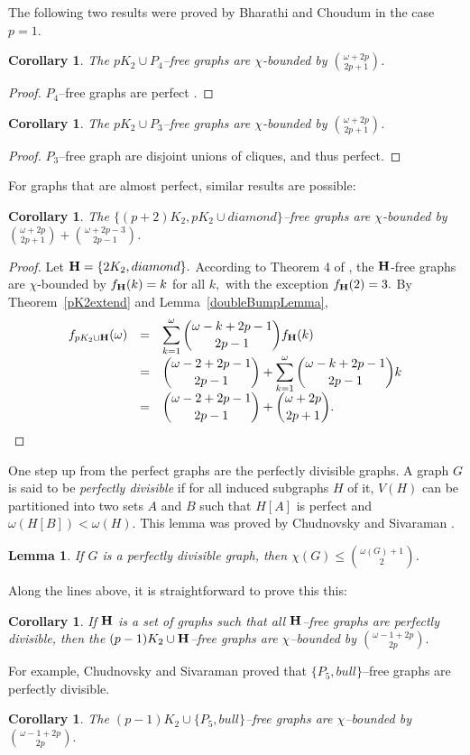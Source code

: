 \documentclass{article}
\theoremstyle{plain}
\newtheorem{lem}[thm]{Lemma}
\newtheorem{cor}[thm]{Corollary}
\theoremstyle{definition}
\begin{document}
The following two results were proved by  Bharathi and Choudum \cite{BC18} in the case $p=1.$
\begin{cor}
The ${ pK_2 \cup P_4}$--free graphs are $\chi$-bounded by $\omega + 2p \choose 2p+1$.
\end{cor}
\begin{proof}
$P_4$--free graphs are perfect \cite{S74}.
\end{proof}
\begin{cor}
The ${ pK_2 \cup P_3}$--free graphs are $\chi$-bounded by $\omega + 2p \choose 2p+1$.
\end{cor}
\begin{proof}
$P_3$--free graph are disjoint unions of cliques, and thus perfect.
\end{proof}

For graphs that are almost perfect, similar results are possible:

\begin{cor}
The $\{ (p+2)K_2, pK_2 \cup diamond\}$--free graphs are $\chi$-bounded by $ {\omega + 2p \choose 2p+1} +   {\omega + 2p-3  \choose 2p-1}  $.
\end{cor}
\begin{proof}
Let ${\bf H} = \{2K_2, diamond\}.$
According to Theorem 4 of \cite{BC18}, the $\bf H$-free graphs are $\chi$-bounded by $ f_{{\bf H  } }(k) = k$ for all $k,$ with the exception $ f_{{\bf H  } }(2) = 3.$
By Theorem~\ref{pK2extend} and Lemma~\ref{doubleBumpLemma}, 
\[
\begin{array}{rcl}
\displaystyle
f_{pK_2 \cup {\bf H  } }(\omega) & =& \displaystyle  \sum_{k=1}^{\omega}   {\omega-k + 2p-1  \choose 2p-1}    f_{{\bf H  } }(k)  \\ 
& = &  \displaystyle   {\omega-2 + 2p-1  \choose 2p-1}  + \sum_{k=1}^{\omega}   {\omega-k + 2p-1  \choose 2p-1}  k \\
& = &  \displaystyle   {\omega-2 + 2p-1  \choose 2p-1}  + { \omega + 2p \choose 2p+1 }.
\end{array}
\]
\end{proof}

One step up from the perfect graphs are the perfectly divisible graphs. A graph $G$ is said to be \emph{perfectly divisible} if for all induced subgraphs $H$ of it, $V (H)$ can be partitioned into two sets $A$ and $B$ such that $H[A]$ is perfect and $\omega(H[B])<\omega(H).$ This lemma was proved by Chudnovsky and Sivaraman \cite{CS19}.
\begin{lem}
If $G$ is a perfectly divisible graph, then $\chi(G) \leq {\omega(G)+1 \choose 2}$.
\end{lem}
Along the lines above, it is straightforward to prove this this:
\begin{cor} If ${\bf H}$ is a set of graphs such that all ${\bf H}$--free graphs are perfectly divisible, then the $(p-1)K_2\cup {\bf H}$--free graphs are $\chi$--bounded by ${\omega-1 + 2p  \choose 2p}.$
\end{cor}
For example, Chudnovsky and Sivaraman \cite{CS19} proved that $\{P_5,bull\}$--free graphs are perfectly divisible.
\begin{cor} The $(p-1)K_2\cup  \{P_5,bull\}$--free graphs are $\chi$--bounded by ${\omega-1 + 2p  \choose 2p}.$
\end{cor}
\end{document}
